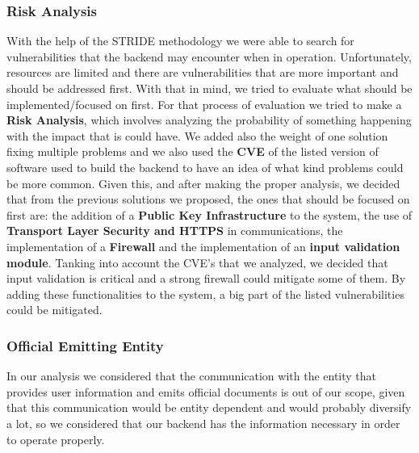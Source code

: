 \subsubsection{Risk Analysis}

With the help of the STRIDE methodology we were able to search for vulnerabilities that the backend may encounter when in operation. Unfortunately, resources are limited and there are vulnerabilities that are more important and should be addressed first. With that in mind, we tried to evaluate what should be implemented/focused on first. For that process of evaluation we tried to make a \textbf{Risk Analysis}, which involves analyzing the probability of something happening with the impact that is could have. We added also the weight of one solution fixing multiple problems and we also used the \textbf{CVE} of the listed version of software used to build the backend to have an idea of what kind problems could be more common.
Given this, and after making the proper analysis, we decided that from the previous solutions we proposed, the ones that should be focused on first are: the addition of a \textbf{Public Key Infrastructure} to the system, the use of \textbf{Transport Layer Security and HTTPS} in communications, the implementation of a \textbf{Firewall} and the implementation of an \textbf{input validation module}. Tanking into account the CVE's that we analyzed, we decided that input validation is critical and a strong firewall could mitigate some of them. By adding these functionalities to the system, a big part of the listed vulnerabilities could be mitigated.

\subsubsection{Official Emitting Entity}


In our analysis we considered that the communication with the entity that provides user information and emits official documents is out of our scope, given that this communication would be entity dependent and would probably diversify a lot, so we considered that our backend has the information necessary in order to operate properly.

\pagebreak